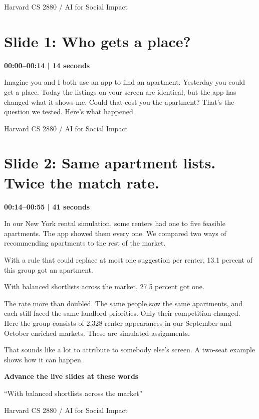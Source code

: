 \documentclass[11pt]{article}
\begin{document}
{\small Harvard CS 2880 / AI for Social Impact}\par
\section*{Slide 1: Who gets a place?}
{\color{navy}\textbf{00:00--00:14 | 14 seconds}}\par\medskip
Imagine you and I both use an app to find an apartment. Yesterday you could get a place. Today the listings on your screen are identical, but the app has changed what it shows me. Could that cost you the apartment? That's the question we tested. Here's what happened.
\par
\newpage
{\small Harvard CS 2880 / AI for Social Impact}\par
\section*{Slide 2: Same apartment lists. Twice the match rate.}
{\color{navy}\textbf{00:14--00:55 | 41 seconds}}\par\medskip
In our New York rental simulation, some renters had one to five feasible apartments. The app showed them every one. We compared two ways of recommending apartments to the rest of the market.
\par
With a rule that could replace at most one suggestion per renter, 13.1 percent of this group got an apartment.
\par
With balanced shortlists across the market, 27.5 percent got one.
\par
The rate more than doubled. The same people saw the same apartments, and each still faced the same landlord priorities. Only their competition changed. Here the group consists of 2,328 renter appearances in our September and October enriched markets. These are simulated assignments.
\par
That sounds like a lot to attribute to somebody else's screen. A two-seat example shows how it can happen.
\par
\vfill{\small\textbf{Advance the live slides at these words}\par}
{\small ``With balanced shortlists across the market''}\par
\newpage
{\small Harvard CS 2880 / AI for Social Impact}\par
\end{document}

